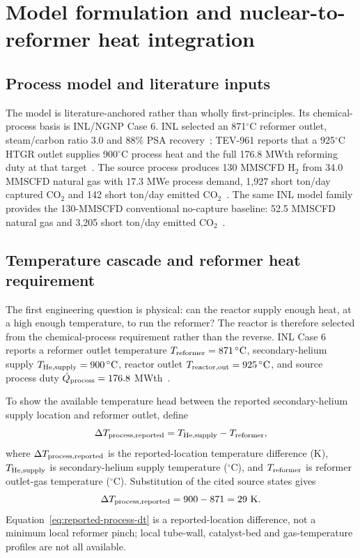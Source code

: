 \section{Model formulation and nuclear-to-reformer heat integration}
\label{sec:final-design}

\subsection{Process model and literature inputs}
The model is literature-anchored rather than wholly first-principles. Its chemical-process basis is INL/NGNP Case 6. INL selected an 871$^\circ$C reformer outlet, steam/carbon ratio 3.0 and 88\% PSA recovery~\cite{inltev953}; TEV-961 reports that a 925$^\circ$C HTGR outlet supplies 900$^\circ$C process heat and the full 176.8 MWth reforming duty at that target~\cite{inltev961}. The source process produces 130 MMSCFD H$_2$ from 34.0 MMSCFD natural gas with 17.3 MWe process demand, 1,927 short ton/day captured CO$_2$ and 142 short ton/day emitted CO$_2$~\cite{inltev961}. The same INL model family provides the 130-MMSCFD conventional no-capture baseline: 52.5 MMSCFD natural gas and 3,205 short ton/day emitted CO$_2$~\cite{inltev953}.

\subsection{Temperature cascade and reformer heat requirement}
The first engineering question is physical: can the reactor supply enough heat, at a high enough temperature, to run the reformer? The reactor is therefore selected from the chemical-process requirement rather than the reverse. INL Case 6 reports a reformer outlet temperature $T_{\rm reformer}=871\,^{\circ}\mathrm C$, secondary-helium supply $T_{\rm He,supply}=900\,^{\circ}\mathrm C$, reactor outlet $T_{\rm reactor,out}=925\,^{\circ}\mathrm C$, and source process duty $\dot Q_{\rm process}=176.8$ MWth~\cite{inltev953,inltev961}.

To show the available temperature head between the reported secondary-helium supply location and reformer outlet, define
\begin{equation}\label{eq:reported-process-dt-general}
\Delta T_{\rm process,reported}
=T_{\rm He,supply}-T_{\rm reformer},
\end{equation}
where $\Delta T_{\rm process,reported}$ is the reported-location temperature difference (K), $T_{\rm He,supply}$ is secondary-helium supply temperature ($^{\circ}$C), and $T_{\rm reformer}$ is reformer outlet-gas temperature ($^{\circ}$C). Substitution of the cited source states gives
\begin{equation}\label{eq:reported-process-dt}
\Delta T_{\rm process,reported}
=900-871=29~\mathrm K.
\end{equation}
Equation~\ref{eq:reported-process-dt} is a reported-location difference, not a minimum local reformer pinch; local tube-wall, catalyst-bed and gas-temperature profiles are not all available.

